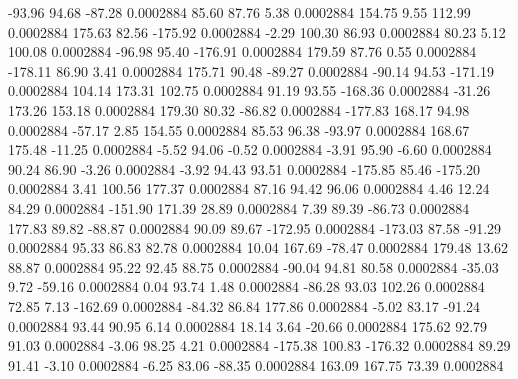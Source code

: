       -93.96       94.68      -87.28     0.0002884
       85.60       87.76        5.38     0.0002884
      154.75        9.55      112.99     0.0002884
      175.63       82.56     -175.92     0.0002884
       -2.29      100.30       86.93     0.0002884
       80.23        5.12      100.08     0.0002884
      -96.98       95.40     -176.91     0.0002884
      179.59       87.76        0.55     0.0002884
     -178.11       86.90        3.41     0.0002884
      175.71       90.48      -89.27     0.0002884
      -90.14       94.53     -171.19     0.0002884
      104.14      173.31      102.75     0.0002884
       91.19       93.55     -168.36     0.0002884
      -31.26      173.26      153.18     0.0002884
      179.30       80.32      -86.82     0.0002884
     -177.83      168.17       94.98     0.0002884
      -57.17        2.85      154.55     0.0002884
       85.53       96.38      -93.97     0.0002884
      168.67      175.48      -11.25     0.0002884
       -5.52       94.06       -0.52     0.0002884
       -3.91       95.90       -6.60     0.0002884
       90.24       86.90       -3.26     0.0002884
       -3.92       94.43       93.51     0.0002884
     -175.85       85.46     -175.20     0.0002884
        3.41      100.56      177.37     0.0002884
       87.16       94.42       96.06     0.0002884
        4.46       12.24       84.29     0.0002884
     -151.90      171.39       28.89     0.0002884
        7.39       89.39      -86.73     0.0002884
      177.83       89.82      -88.87     0.0002884
       90.09       89.67     -172.95     0.0002884
     -173.03       87.58      -91.29     0.0002884
       95.33       86.83       82.78     0.0002884
       10.04      167.69      -78.47     0.0002884
      179.48       13.62       88.87     0.0002884
       95.22       92.45       88.75     0.0002884
      -90.04       94.81       80.58     0.0002884
      -35.03        9.72      -59.16     0.0002884
        0.04       93.74        1.48     0.0002884
      -86.28       93.03      102.26     0.0002884
       72.85        7.13     -162.69     0.0002884
      -84.32       86.84      177.86     0.0002884
       -5.02       83.17      -91.24     0.0002884
       93.44       90.95        6.14     0.0002884
       18.14        3.64      -20.66     0.0002884
      175.62       92.79       91.03     0.0002884
       -3.06       98.25        4.21     0.0002884
     -175.38      100.83     -176.32     0.0002884
       89.29       91.41       -3.10     0.0002884
       -6.25       83.06      -88.35     0.0002884
      163.09      167.75       73.39     0.0002884
